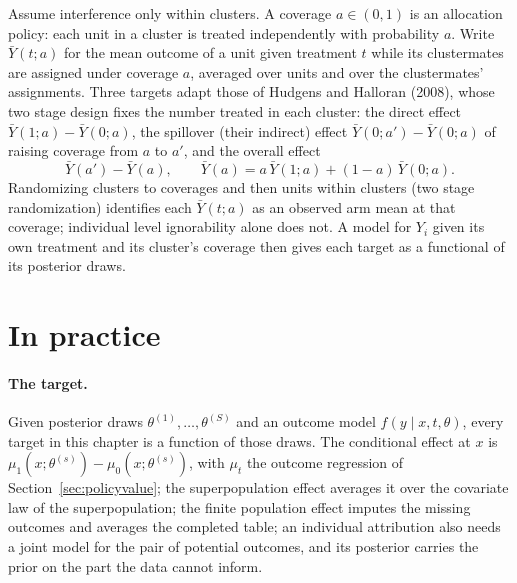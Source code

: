 Assume interference only within clusters. A coverage $a \in (0,1)$ is an allocation policy: each unit in a cluster is treated independently with probability $a$. Write $\bar Y(t; a)$ for the mean outcome of a unit given treatment $t$ while its clustermates are assigned under coverage $a$, averaged over units and over the clustermates' assignments. Three targets adapt those of Hudgens and Halloran (2008), whose two stage design fixes the number treated in each cluster: the direct effect $\bar Y(1; a) - \bar Y(0; a)$, the spillover (their indirect) effect $\bar Y(0; a') - \bar Y(0; a)$ of raising coverage from $a$ to $a'$, and the overall effect
\[
\bar Y(a') - \bar Y(a), \qquad \bar Y(a) = a\,\bar Y(1; a) + (1 - a)\,\bar Y(0; a).
\]
Randomizing clusters to coverages and then units within clusters (two stage randomization) identifies each $\bar Y(t; a)$ as an observed arm mean at that coverage; individual level ignorability alone does not. A model for $Y_i$ given its own treatment and its cluster's coverage then gives each target as a functional of its posterior draws.

\section{In practice}\label{sec:inpractice}

\paragraph{The target.} Given posterior draws $\theta^{(1)}, \ldots, \theta^{(S)}$ and an outcome model $f(y \mid x, t, \theta)$, every target in this chapter is a function of those draws. The conditional effect at $x$ is $\mu_1(x;\theta^{(s)}) - \mu_0(x;\theta^{(s)})$, with $\mu_t$ the outcome regression of Section~\ref{sec:policyvalue}; the superpopulation effect averages it over the covariate law of the superpopulation; the finite population effect imputes the missing outcomes and averages the completed table; an individual attribution also needs a joint model for the pair of potential outcomes, and its posterior carries the prior on the part the data cannot inform.

